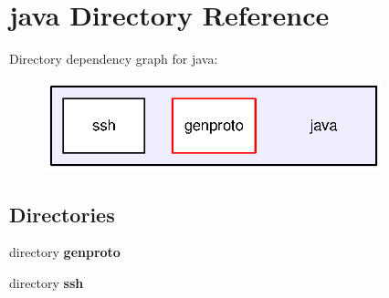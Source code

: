 \section{java Directory Reference}
\label{dir_93c6ba7fb77bae0709fae89c9c13b44a}
Directory dependency graph for java\+:\nopagebreak
\begin{figure}[H]
\begin{center}
\leavevmode
\includegraphics[width=276pt]{dir_93c6ba7fb77bae0709fae89c9c13b44a_dep}
\end{center}
\end{figure}
\subsection*{Directories}
\begin{DoxyCompactItemize}
\item 
directory {\bf genproto}
\item 
directory {\bf ssh}
\end{DoxyCompactItemize}

